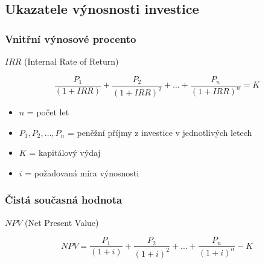 \subsection{Ukazatele výnosnosti investice}

\subsubsection*{Vnitřní výnosové procento}

$IRR$ (Internal Rate of Return)

\begin{equation}
    \frac{P_1}{(1+IRR)} + \frac{P_2}{(1+IRR)^2} + \ldots + \frac{P_n}{(1+IRR)^n} = K
\end{equation}

\begin{itemize}
    \item $n$ = počet let
    \item $P_1, P_2, \ldots, P_n$ = peněžní příjmy z investice v jednotlivých letech
    \item $K$ = kapitálový výdaj
    \item $i$ = požadovaná míra výnosnosti
\end{itemize}

\subsubsection*{Čistá současná hodnota}

$NPV$ (Net Present Value)

\begin{equation}
    NPV = \frac{P_1}{(1+i)} + \frac{P_2}{(1+i)^2} + \ldots + \frac{P_n}{(1+i)^n} - K
\end{equation}
